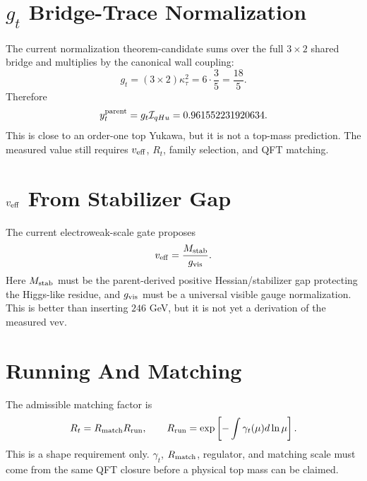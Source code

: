 \documentclass[11pt]{article}
\begin{document}
\section{$g_t$ Bridge-Trace Normalization}
The current normalization theorem-candidate sums over the full $3\times2$
shared bridge and multiplies by the canonical wall coupling:
\begin{equation}
g_t=(3\times2)\kappa_\tau^2=6\cdot\frac35=\frac{18}{5}.
\end{equation}
Therefore
\begin{equation}
y_t^{\rm parent}
=g_t{\cal I}_{qHu}
=0.961552231920634.
\end{equation}
This is close to an order-one top Yukawa, but it is not a top-mass prediction.
The measured value still requires $v_{\rm eff}$, $R_t$, family selection,
and QFT matching.

\section{$v_{\rm eff}$ From Stabilizer Gap}
The current electroweak-scale gate proposes
\begin{equation}
v_{\rm eff}=\frac{M_{\rm stab}}{g_{\rm vis}}.
\end{equation}
Here $M_{\rm stab}$ must be the parent-derived positive Hessian/stabilizer
gap protecting the Higgs-like residue, and $g_{\rm vis}$ must be a universal
visible gauge normalization.  This is better than inserting $246$ GeV, but it
is not yet a derivation of the measured vev.

\section{Running And Matching}
The admissible matching factor is
\begin{equation}
R_t=R_{\rm match}R_{\rm run},
\qquad
R_{\rm run}=\exp\left[-\int \gamma_t(\mu)d\ln\mu\right].
\end{equation}
This is a shape requirement only.  $\gamma_t$, $R_{\rm match}$, regulator,
and matching scale must come from the same QFT closure before a physical top
mass can be claimed.
\end{document}
